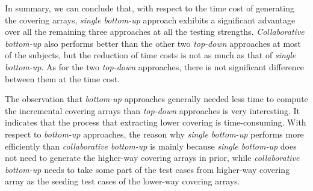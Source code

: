 \documentclass[conference]{IEEEtran}
\theoremstyle{definition}
\begin{document}

In summary, we can conclude that, with respect to the time cost of generating the covering arrays, \emph{single bottom-up} approach exhibits a significant advantage over all the remaining three approaches at all the testing strengths. \emph{Collaborative bottom-up} also performs better than the other two \emph{top-down} approaches at most of the subjects, but the reduction of time costs is not as much as that of \emph{single bottom-up}. As for the two \emph{top-down} approaches, there is not significant difference between them at the time cost.



The observation that \emph{bottom-up} approaches generally needed less time to compute the incremental covering arrays than \emph{top-down} approaches is very interesting. It indicates that the process that extracting lower covering is time-consuming. With respect to \emph{bottom-up} approaches,  the reason why \emph{single bottom-up} performs more efficiently than \emph{collaborative bottom-up} is mainly because  \emph{single bottom-up} does not need to generate the higher-way covering arrays in prior, while \emph{collaborative bottom-up}  needs to take some part of the test cases from higher-way covering array as the seeding test cases of the lower-way covering arrays.
\end{document}
